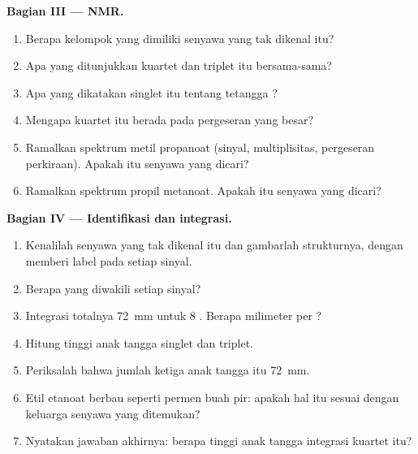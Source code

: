 \begin{problem}
\medskip
\noindent\textbf{Bagian III --- NMR.}
\begin{enumerate}[resume]
  \item Berapa kelompok  yang dimiliki senyawa yang tak
        dikenal itu?
  \item Apa yang ditunjukkan kuartet dan triplet itu bersama-sama?
  \item Apa yang dikatakan singlet itu tentang tetangga ?
  \item Mengapa kuartet itu berada pada pergeseran yang besar?
  \item Ramalkan spektrum metil propanoat 
        (sinyal, multiplisitas, pergeseran perkiraan). Apakah itu senyawa
        yang dicari?
  \item Ramalkan spektrum propil metanoat. Apakah itu senyawa yang
        dicari?
\end{enumerate}

\medskip
\noindent\textbf{Bagian IV --- Identifikasi dan integrasi.}
\begin{enumerate}[resume]
  \item Kenalilah senyawa yang tak dikenal itu dan gambarlah
        strukturnya, dengan memberi label pada setiap sinyal.
  \item Berapa  yang diwakili setiap sinyal?
  \item Integrasi totalnya \qty{72}{mm} untuk 8 . Berapa milimeter
        per ?
  \item Hitung tinggi anak tangga singlet dan triplet.
  \item Periksalah bahwa jumlah ketiga anak tangga itu \qty{72}{mm}.
  \item Etil etanoat berbau seperti permen buah pir: apakah hal itu
        sesuai dengan keluarga senyawa yang ditemukan?
  \item Nyatakan jawaban akhirnya: berapa tinggi anak tangga integrasi
        kuartet itu?
\end{enumerate}
\end{problem}
